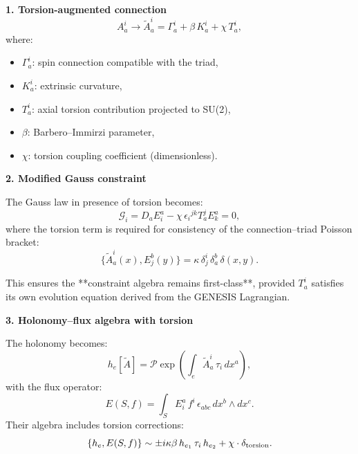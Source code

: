 \documentclass{article}
\begin{document}
\vspace{1em}
\noindent\textbf{1. Torsion-augmented connection}
\begin{equation}
  A^i_a \longrightarrow \tilde A^i_a = \Gamma^i_a + \beta\,K^i_a + \chi\,T^i_a,
\end{equation}
where:
\begin{itemize}[leftmargin=2em]
  \item \( \Gamma^i_a \): spin connection compatible with the triad,
  \item \( K^i_a \): extrinsic curvature,
  \item \( T^i_a \): axial torsion contribution projected to SU(2),
  \item \( \beta \): Barbero–Immirzi parameter,
  \item \( \chi \): torsion coupling coefficient (dimensionless).
\end{itemize}

\vspace{1em}
\noindent\textbf{2. Modified Gauss constraint}

The Gauss law in presence of torsion becomes:
\begin{equation}\label{eq:auto147}
\mathcal{G}_i = D_a E^a_i - \chi\,\epsilon_{i}{}^{jk} T^j_a E^a_k = 0,
\end{equation}
where the torsion term is required for consistency of the connection–triad Poisson bracket:
\begin{equation}\label{eq:auto148}
\{ \tilde A^i_a(x), E^b_j(y) \} = \kappa\,\delta^i_j\,\delta^b_a\,\delta(x,y).
\end{equation}

This ensures the **constraint algebra remains first-class**, provided \( T^i_a \) satisfies its own evolution equation derived from the GENESIS Lagrangian.

\vspace{1em}
\noindent\textbf{3. Holonomy–flux algebra with torsion}

The holonomy becomes:
\begin{equation}\label{eq:auto149}
h_e[\tilde A] = \mathcal{P} \exp \left( \int_e \tilde A^i_a\,\tau_i\,dx^a \right),
\end{equation}
with the flux operator:
\begin{equation}\label{eq:auto150}
E(S,f) = \int_S E^a_i\,f^i\,\epsilon_{abc}\,dx^b \wedge dx^c.
\end{equation}
Their algebra includes torsion corrections:
\begin{equation}\label{eq:auto151}
\{ h_e, E(S,f) \} \sim \pm i\kappa\beta\,h_{e_1}\,\tau_i\,h_{e_2} + \chi \cdot \delta_{\rm torsion}.
\end{equation}
\end{document}
